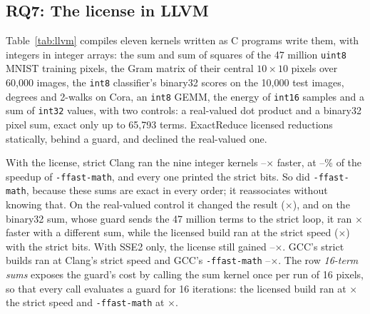 \documentclass[acmsmall,review,anonymous,nonacm]{acmart}
\begin{document}
\subsection{RQ7: The license in LLVM}\label{sec:rq7}
\begin{table}[t]
\caption{RQ7 on M2. C reductions over integer data, compiled with
\texttt{-O3 -march=native}: the pass's decision, the median time under strict
Clang~\LlvmClang, and speedups over it of strict Clang with ExactReduce, of
Clang \texttt{-ffast-math}, of ExactReduce for baseline x86-64 (SSE2), and of
GCC~\LlvmGcc{} strict and \texttt{-ffast-math}. Medians of five processes of
eleven runs. $^\dagger$ marks outputs that differ from strict Clang's. Below
the line, the two controls.}
\label{tab:llvm}\centering\footnotesize\setlength{\tabcolsep}{4pt}
\end{table}
Table~\ref{tab:llvm} compiles eleven kernels written as C programs write them,
with integers in integer arrays: the sum and sum of squares of the 47 million
\texttt{uint8} MNIST training pixels, the Gram matrix of their central
$10\times10$ pixels over 60,000 images, the \texttt{int8} classifier's binary32
scores on the 10,000 test images, degrees and 2-walks on Cora, an \texttt{int8}
GEMM, the energy of \texttt{int16} samples and a sum of \texttt{int32} values,
with two controls: a real-valued dot product and a binary32 pixel sum, exact
only up to 65,793 terms. ExactReduce licensed \LlvmBenchStatic{} reductions
statically, \LlvmBenchGuarded{} behind a guard, and declined the real-valued one.

With the license, strict Clang ran the nine integer kernels
\LlvmBenchLicensedLo--\LlvmBenchLicensedHi$\times$ faster, at
\LlvmBenchOfFastMathLo--\LlvmBenchOfFastMathHi\% of the speedup of
\texttt{-ffast-math}, and every one printed the strict bits. So did
\texttt{-ffast-math}, because these sums are exact in every order; it
reassociates without knowing that. On the real-valued control it changed the
result (\LlvmBenchDotRealFastMath$\times$), and on the binary32 sum, whose guard
sends the 47 million terms to the strict loop, it ran
\LlvmBenchSumSingleFastMath$\times$ faster with a different sum, while the
licensed build ran at the strict speed (\LlvmBenchSumSingleLicensed$\times$)
with the strict bits. With SSE2 only, the license still gained
\LlvmBenchLicensedSseLo--\LlvmBenchLicensedSseHi$\times$. GCC's strict builds
ran at Clang's strict speed and GCC's \texttt{-ffast-math}
\LlvmBenchGccFastMathLo--\LlvmBenchGccFastMathHi$\times$. The row
\emph{16-term sums} exposes the guard's cost by calling the sum kernel once per
run of 16 pixels, so that every call evaluates a guard for 16 iterations: the
licensed build ran at \LlvmKernelSumUEightShortLicensed$\times$ the strict
speed and \texttt{-ffast-math} at \LlvmKernelSumUEightShortFastMath$\times$.
\end{document}
